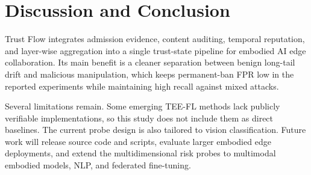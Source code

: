 \documentclass[runningheads,orivec]{llncs}
\begin{document}
\section{Discussion and Conclusion}

Trust Flow integrates admission evidence, content auditing, temporal reputation, and layer-wise aggregation into a single trust-state pipeline for embodied AI edge collaboration. Its main benefit is a cleaner separation between benign long-tail drift and malicious manipulation, which keeps permanent-ban FPR low in the reported experiments while maintaining high recall against mixed attacks.

Several limitations remain. Some emerging TEE-FL methods lack publicly verifiable implementations, so this study does not include them as direct baselines. The current probe design is also tailored to vision classification. Future work will release source code and scripts, evaluate larger embodied edge deployments, and extend the multidimensional risk probes to multimodal embodied models, NLP, and federated fine-tuning.
\end{document}
